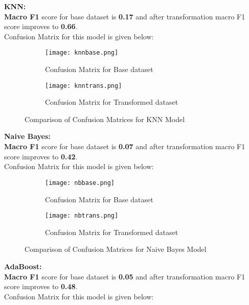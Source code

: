 \documentclass[11pt, oneside]{article}   	%
\begin{document}
\textbf{KNN:}\\
\textbf{Macro F1} score for base dataset is \textbf{0.17} and after transformation macro F1 score improves to \textbf{0.66}.\\ Confusion Matrix for this model is given below:\\
\begin{figure}[H]
  \begin{subfigure}[b]{0.32\textwidth}
    \centering
    \texttt{[image: knnbase.png]}
    \caption{Confusion Matrix for Base dataset}
    \label{fig:confusion_matrix_base}
  \end{subfigure}
  \hfill
  \begin{subfigure}[b]{0.32\textwidth}
    \centering
    \texttt{[image: knntrans.png]}
    \caption{Confusion Matrix for Transformed dataset}
    \label{fig:confusion_matrix_transformed}
  \end{subfigure}
  \caption{Comparison of Confusion Matrices for KNN Model}
  \label{fig:confusion_matrices}
\end{figure}
\textbf{Naive Bayes:}\\
\textbf{Macro F1} score for base dataset is \textbf{0.07} and after transformation macro F1 score improves to \textbf{0.42}.\\ Confusion Matrix for this model is given below:\\
\begin{figure}[H]
  \begin{subfigure}[b]{0.32\textwidth}
    \centering
    \texttt{[image: nbbase.png]}
    \caption{Confusion Matrix for Base dataset}
    \label{fig:confusion_matrix_base}
  \end{subfigure}
  \hfill
  \begin{subfigure}[b]{0.32\textwidth}
    \centering
    \texttt{[image: nbtrans.png]}
    \caption{Confusion Matrix for Transformed dataset}
    \label{fig:confusion_matrix_transformed}
  \end{subfigure}
  \caption{Comparison of Confusion Matrices for Naive Bayes Model}
  \label{fig:confusion_matrices}
\end{figure}
\textbf{AdaBoost:}
\\
\textbf{Macro F1} score for base dataset is \textbf{0.05} and after transformation macro F1 score improves to \textbf{0.48}.\\ Confusion Matrix for this model is given below:\\
\end{document}
